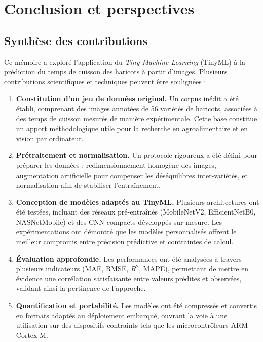 \chapter{Conclusion et perspectives}
\label{chap:conclusion_et_perspectives}

\section{Synthèse des contributions}
\label{sec:synthese_contributions}

Ce mémoire a exploré l’application du \textit{Tiny Machine Learning} (TinyML) à la prédiction du temps de cuisson des haricots à partir d’images. Plusieurs contributions scientifiques et techniques peuvent être soulignées :

\begin{enumerate}
    \item \textbf{Constitution d’un jeu de données original.} Un corpus inédit a été établi, comprenant des images annotées de 56 variétés de haricots, associées à des temps de cuisson mesurés de manière expérimentale. Cette base constitue un apport méthodologique utile pour la recherche en agroalimentaire et en vision par ordinateur.
    
    \item \textbf{Prétraitement et normalisation.} Un protocole rigoureux a été défini pour préparer les données : redimensionnement homogène des images, augmentation artificielle pour compenser les déséquilibres inter-variétés, et normalisation afin de stabiliser l’entraînement.
    
    \item \textbf{Conception de modèles adaptés au TinyML.} Plusieurs architectures ont été testées, incluant des réseaux pré-entraînés (MobileNetV2, EfficientNetB0, NASNetMobile) et des CNN compacts développés sur mesure. Les expérimentations ont démontré que les modèles personnalisés offrent le meilleur compromis entre précision prédictive et contraintes de calcul.
    
    \item \textbf{Évaluation approfondie.} Les performances ont été analysées à travers plusieurs indicateurs (MAE, RMSE, $R^2$, MAPE), permettant de mettre en évidence une corrélation satisfaisante entre valeurs prédites et observées, validant ainsi la pertinence de l’approche.
    
    \item \textbf{Quantification et portabilité.} Les modèles ont été compressés et convertis en formats adaptés au déploiement embarqué, ouvrant la voie à une utilisation sur des dispositifs contraints tels que les microcontrôleurs ARM Cortex-M.
\end{enumerate}

